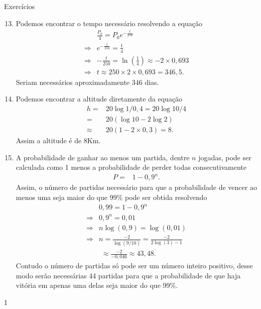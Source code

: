 \clearmargin
\begin{answer}{Exercícios}
{\exerciselist
\begin{enumerate}\setcounter{enumi}{12}
\item Podemos encontrar o tempo necessário resolvendo a equação
\begin{align*}
& \frac{P_0}{4} = P_0 e^{-\frac{t}{250}}\\
\Rightarrow & e^{-\frac{t}{250}} = \frac{1}{4}\\
\Rightarrow & -\frac{t}{250} = \ln \left(\frac{1}{4}\right) \approx -2 \times 0{,}693\\
\Rightarrow & t \approx 250 \times 2 \times 0{,}693 = 346{,}5.
\end{align*}
Seriam necessários aproximadamente 346 dias.

\item Podemos encontrar a altitude diretamente da equação
\begin{align*}
 h =& 20 \log 1/0{,}4 = 20 \log 10/4\\
=& 20 (\log 10 -2\log 2)\\
\approx& 20 (1-2\times0,3) = 8.
\end{align*}
Assim a altitude é de 8Km.

\item A probabilidade de ganhar ao menos um partida, dentre $n$ jogadas, pode ser calculada como 1 menos a probabilidade de perder todas consecutivamente
\begin{align*}
P =& 1 - 0{,}9^n.
\end{align*}
Assim, o número de partidas necessário para que a probabilidade de vencer ao menos uma seja maior do que 99\% pode ser obtida resolvendo
\begin{align*}
 &0{,}99 = 1 - 0{,}9^n\\
\Rightarrow & 0{,}9^n = 0{,}01\\
\Rightarrow & n\log(0{,}9) = \log(0{,}01)\\
\Rightarrow & n = \frac{-2}{\log(9/10)}= \frac{-2}{2\log(3)-1}\\
& \,\, \approx\frac{-2}{-0{,}046} \approx 43{,}48.
\end{align*}
Contudo o número de partidas só pode ser um número inteiro positivo, desse modo serão necessárias 44 partidas para que a probabilidade de que haja vitória em apenas uma delas seja maior do que 99\%.
\end{enumerate}
}{1}
\end{answer}



